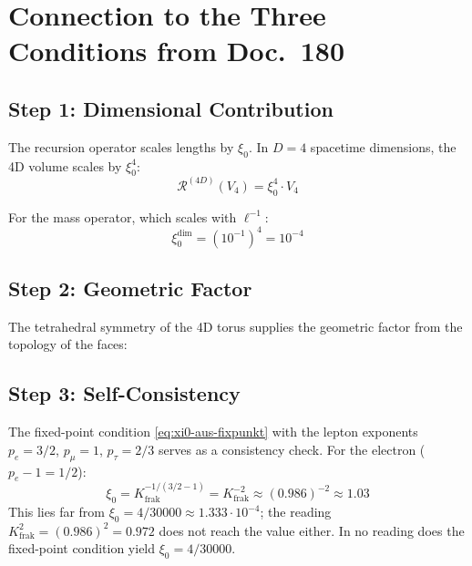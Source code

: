 \section{Connection to the Three Conditions from Doc.~180}

\subsection{Step 1: Dimensional Contribution}

The recursion operator scales lengths by $\xi_0$. In $D=4$
spacetime dimensions, the 4D volume scales by $\xi_0^4$:
\begin{equation}
  \mathcal{R}^{(4D)}(V_4) = \xi_0^4 \cdot V_4
\end{equation}

For the mass operator, which scales with $\ell^{-1}$:
\begin{equation}
  \xi_0^{\text{dim}} = (10^{-1})^4 = 10^{-4}
\end{equation}

\subsection{Step 2: Geometric Factor}

The tetrahedral symmetry of the 4D torus supplies the geometric factor
from the topology of the faces:

\begin{center}
{\footnotesize
{}}
\end{center}

\subsection{Step 3: Self-Consistency}

The fixed-point condition \eqref{eq:xi0-aus-fixpunkt} with the lepton exponents
$p_e = 3/2$, $p_\mu = 1$, $p_\tau = 2/3$ serves as a consistency check.
For the electron ($p_e - 1 = 1/2$):
\begin{equation}
  \xi_0 = K_{\text{frak}}^{-1/(3/2 - 1)}
  = K_{\text{frak}}^{-2}
  \approx (0.986)^{-2} \approx 1.03
\end{equation}
This lies far from $\xi_0 = 4/30000 \approx 1.333 \cdot 10^{-4}$;
the reading $K_{\text{frak}}^2 = (0.986)^2 = 0.972$ does not reach
the value either. In no reading does the fixed-point condition yield
$\xi_0 = 4/30000$.

